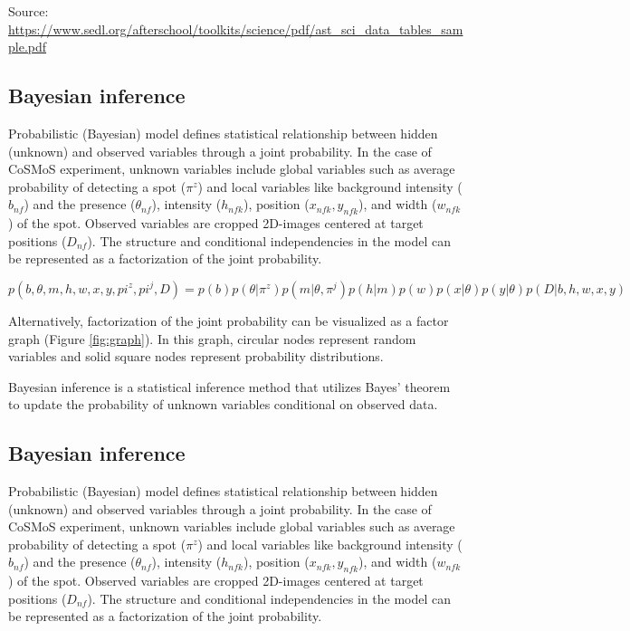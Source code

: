 \begin{table}[bt]
\medskip 
Source: \url{https://www.sedl.org/afterschool/toolkits/science/pdf/ast_sci_data_tables_sample.pdf}


\end{table}

\subsection{Bayesian inference}

Probabilistic (Bayesian) model defines statistical relationship between hidden (unknown) and observed variables through a joint probability. In the case of CoSMoS experiment, unknown variables include global variables such as average probability of detecting a spot ($\pi^z$) and local variables like background intensity ($b_{nf}$) and the presence ($\theta_{nf}$), intensity ($h_{nfk}$), position ($x_{nfk}, y_{nfk}$), and width ($w_{nfk}$) of the spot. Observed variables are cropped 2D-images centered at target positions ($D_{nf}$). The structure and conditional independencies in the model can be represented as a factorization of the joint probability.

\textbf{\begin{equation*}
    p(b,\theta,m,h,w,x,y,pi^z,pi^j,D) = p(b)p(\theta|\pi^z)p(m|\theta,\pi^j)p(h|m)p(w)p(x|\theta)p(y|\theta)p(D|b,h,w,x,y)
\end{equation*}}


Alternatively, factorization of the joint probability can be visualized as a factor graph (Figure \ref{fig:graph}). In this graph, circular nodes represent random variables and solid square nodes represent probability distributions.

Bayesian inference is a statistical inference method that utilizes Bayes' theorem to update the probability of unknown variables conditional on observed data.

\subsection{Bayesian inference}

Probabilistic (Bayesian) model defines statistical relationship between hidden (unknown) and observed variables through a joint probability. In the case of CoSMoS experiment, unknown variables include global variables such as average probability of detecting a spot ($\pi^z$) and local variables like background intensity ($b_{nf}$) and the presence ($\theta_{nf}$), intensity ($h_{nfk}$), position ($x_{nfk}, y_{nfk}$), and width ($w_{nfk}$) of the spot. Observed variables are cropped 2D-images centered at target positions ($D_{nf}$). The structure and conditional independencies in the model can be represented as a factorization of the joint probability.

